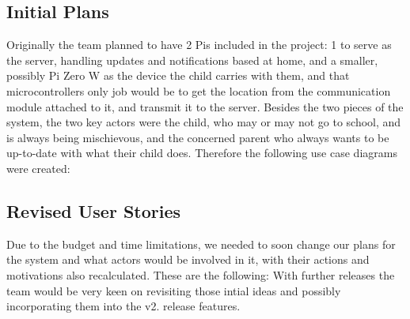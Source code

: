 \subsection*{Initial Plans}

Originally the team planned to have 2 Pis included in the project\+: 1 to serve as the server, handling updates and notifications based at home, and a smaller, possibly Pi Zero W as the device the child carries with them, and that microcontroller\textquotesingle{}s only job would be to get the location from the communication module attached to it, and transmit it to the server. Besides the two pieces of the system, the two key actors were the child, who may or may not go to school, and is always being mischievous, and the concerned parent who always wants to be up-\/to-\/date with what their child does. Therefore the following use case diagrams were created\+:    

\subsection*{Revised User Stories}

Due to the budget and time limitations, we needed to soon change our plans for the system and what actors would be involved in it, with their actions and motivations also recalculated. These are the following\+:     With further releases the team would be very keen on revisiting those intial ideas and possibly incorporating them into the v2. release features. 